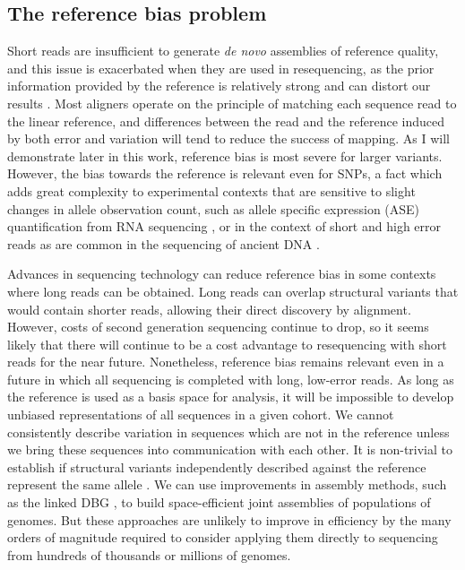 \subsection{The reference bias problem}

Short reads are insufficient to generate \emph{de novo} assemblies of reference quality, and this issue is exacerbated when they are used in resequencing, as the prior information provided by the reference is relatively strong and can distort our results \cite{sudmant2015integrated}.
Most aligners operate on the principle of matching each sequence read to the linear reference, and differences between the read and the reference induced by both error and variation will tend to reduce the success of mapping.
As I will demonstrate later in this work, reference bias is most severe for larger variants.
However, the bias towards the reference is relevant even for SNPs, a fact which adds great complexity to experimental contexts that are sensitive to slight changes in allele observation count, such as allele specific expression (ASE) quantification from RNA sequencing \cite{stevenson2013sources}, or in the context of short and high error reads as are common in the sequencing of ancient DNA \cite{zhou2017antcaller}.

Advances in sequencing technology can reduce reference bias in some contexts where long reads can be obtained.
Long reads can overlap structural variants that would contain shorter reads, allowing their direct discovery by alignment.
However, costs of second generation sequencing continue to drop, so it seems likely that there will continue to be a cost advantage to resequencing with short reads for the near future.
Nonetheless, reference bias remains relevant even in a future in which all sequencing is completed with long, low-error reads.
As long as the reference is used as a basis space for analysis, it will be impossible to develop unbiased representations of all sequences in a given cohort.
We cannot consistently describe variation in sequences which are not in the reference unless we bring these sequences into communication with each other.
It is non-trivial to establish if structural variants independently described against the reference represent the same allele \cite{chaisson2018multi}.
We can use improvements in assembly methods, such as the linked DBG \cite{turner2018integrating}, to build space-efficient joint assemblies of populations of genomes.
But these approaches are unlikely to improve in efficiency by the many orders of magnitude required to consider applying them directly to sequencing from hundreds of thousands or millions of genomes.

